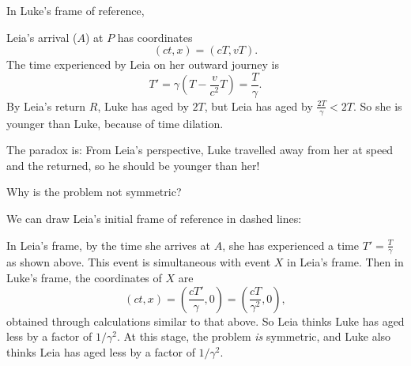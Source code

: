 \documentclass[a4paper]{article}
\begin{document}
In Luke's frame of reference,
\begin{center}
\end{center}
Leia's arrival ($A$) at $P$ has coordinates
\[
  (ct, x) = (cT, vT).
\]
The time experienced by Leia on her outward journey is
\[
  T' = \gamma\left(T - \frac{v}{c^2}T\right) = \frac{T}{\gamma}.
\]
By Leia's return $R$, Luke has aged by $2T$, but Leia has aged by $\frac{2T}{\gamma} < 2T$. So she is younger than Luke, because of time dilation.

The paradox is: From Leia's perspective, Luke travelled away from her at speed and the returned, so he should be younger than her!

Why is the problem not symmetric?

We can draw Leia's initial frame of reference in dashed lines:
\begin{center}
\end{center}
In Leia's frame, by the time she arrives at $A$, she has experienced a time $T' = \frac{T}{\gamma}$ as shown above. This event is simultaneous with event $X$ in Leia's frame. Then in Luke's frame, the coordinates of $X$ are
\[
  (ct, x) = \left(\frac{cT'}{\gamma}, 0\right) = \left(\frac{cT}{\gamma^2}, 0\right),
\]
obtained through calculations similar to that above. So Leia thinks Luke has aged less by a factor of $1/\gamma^2$. At this stage, the problem \emph{is} symmetric, and Luke also thinks Leia has aged less by a factor of $1/\gamma^2$.
\end{document}
